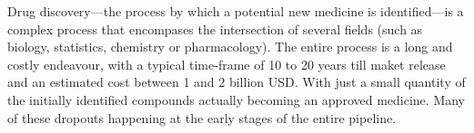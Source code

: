 \documentclass{article}
\begin{document}
    
    
    


Drug discovery—the process by which a potential new medicine is identified---is a complex
 process that encompases the intersection of several fields (such as biology, statistics,
 chemistry or pharmacology). The entire process is a long and costly endeavour, with a
 typical time-frame of 10 to 20 years till maket release and an estimated cost between 1
 and 2 billion USD. With just a small quantity of the initially identified compounds
 actually becoming an approved medicine. Many of these dropouts happening at the early
 stages of the entire pipeline.
\end{document}
